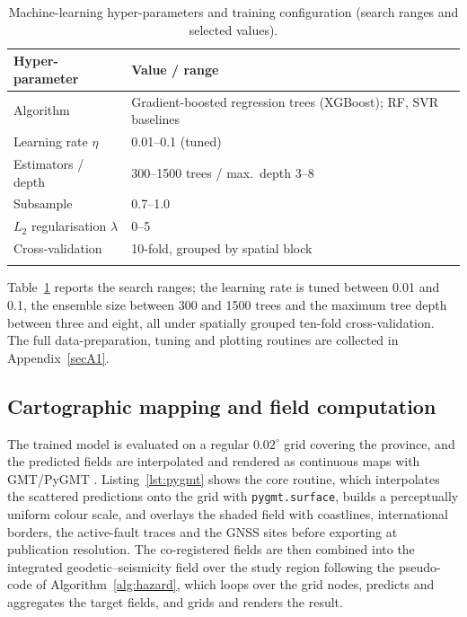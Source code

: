 \documentclass[pdflatex,sn-mathphys-num]{sn-jnl}%
\theoremstyle{thmstyleone}%
\theoremstyle{thmstyletwo}%
\theoremstyle{thmstylethree}%
\begin{document}
\begin{table}[htbp]
  \caption{Machine-learning hyper-parameters and training configuration (search ranges
  and selected values).}\label{tab:hyper}
  \begin{tabular*}{\textwidth}{@{\extracolsep\fill}ll}
    \toprule
    Hyper-parameter & Value / range \\
    \midrule
    Algorithm & Gradient-boosted regression trees (XGBoost); RF, SVR baselines \\
    Learning rate $\eta$ & 0.01--0.1 (tuned) \\
    Estimators / depth & 300--1500 trees / max.\ depth 3--8 \\
    Subsample & 0.7--1.0 \\
    $L_2$ regularisation $\lambda$ & 0--5 \\
    Cross-validation & 10-fold, grouped by spatial block \\
    \botrule
  \end{tabular*}
\end{table}

Table~\ref{tab:hyper} reports the search ranges; the learning rate is tuned between
0.01 and 0.1, the ensemble size between 300 and 1500 trees and the maximum tree depth
between three and eight, all under spatially grouped ten-fold cross-validation. The
full data-preparation, tuning and plotting routines are collected in
Appendix~\ref{secA1}.

\subsection{Cartographic mapping and field computation}\label{sec:mapping}
The trained model is evaluated on a regular $0.02^{\circ}$ grid covering the province,
and the predicted fields are interpolated and rendered as continuous maps with
GMT/PyGMT \cite{Wessel2019,Sandwell2014,Lemenkova202404,Harris2020,Pedregosa2011,Hunter2007}. Listing~\ref{lst:pygmt}
shows the core routine, which interpolates the scattered predictions onto the grid with
\texttt{pygmt.surface}, builds a perceptually uniform colour scale, and overlays the
shaded field with coastlines, international borders, the active-fault traces and the GNSS
sites before exporting at publication resolution. The co-registered fields are then
combined into the integrated geodetic--seismicity field over the study region following
the pseudo-code of Algorithm~\ref{alg:hazard}, which loops over the grid nodes, predicts
and aggregates the target fields, and grids and renders the result.
\end{document}
